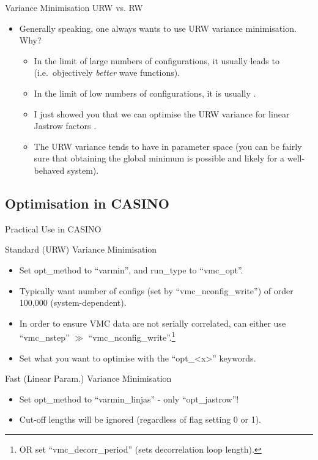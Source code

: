 \documentclass[12pt, pdf, hyperref={draft}, usenames, dvipsnames,
aspectratio=169]{beamer}
\newcommand{\green}[1]{{\bf\color{ForestGreen}{#1}}}
\begin{document}
\begin{frame}{Variance Minimisation URW vs. RW}
\begin{itemize}
  \item Generally speaking, one always wants to use URW variance minimisation.
  Why?
  \begin{itemize}
    \item In the limit of large numbers of configurations, it usually leads to
    \green{lower energies} (i.e.\ objectively \textit{better} wave functions).
    \item In the limit of low numbers of configurations, it is usually \green{more
    stable}.
    \item I just showed you that we can optimise the URW variance for linear
    Jastrow factors \green{very efficiently}.
    \item The URW variance tends to have \green{fewer spurious minima} in parameter
    space (you can be fairly sure that obtaining the global minimum is possible
    and likely for a well-behaved system).
  \end{itemize}
\end{itemize}
\end{frame}

\subsection{Optimisation in CASINO}\label{sub:optimisation_in_casino}

\begin{frame}{Practical Use in CASINO}

\begin{block}{Standard (URW) Variance Minimisation}
\begin{itemize}
  \item Set opt\_method to ``varmin'', and run\_type to ``vmc\_opt''.
  \item Typically want number of configs (set by ``vmc\_nconfig\_write'') of order 100,000
(system-dependent).
  \item In order to ensure VMC data are not serially correlated,
can either use ``vmc\_nstep'' $\gg$ ``vmc\_nconfig\_write''.\footnote{OR set
``vmc\_decorr\_period'' (sets decorrelation loop length).}
  \item Set what you want to optimise with the ``opt\_<x>'' keywords.
\end{itemize}
\end{block}

\begin{block}{Fast (Linear Param.) Variance Minimisation}
\begin{itemize}
  \item Set opt\_method to ``varmin\_linjas'' - only ``opt\_jastrow''!
  \item Cut-off lengths will be ignored (regardless of flag setting 0 or 1).
\end{itemize}
\end{block}
\end{frame}
\end{document}

